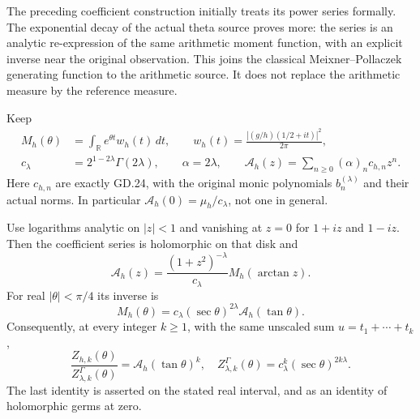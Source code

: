 The preceding coefficient construction initially treats its power series
formally. The exponential decay of the actual theta source proves more:
the series is an analytic re-expression of the same arithmetic moment
function, with an explicit inverse near the original observation.
This joins the classical Meixner--Pollaczek generating function to the
arithmetic source. It does not replace the arithmetic measure by the
reference measure.

Keep
\[
\begin{split}
M_h(\theta)&=\int_{\mathbb R}e^{\theta t}w_h(t)\,dt,
\qquad w_h(t)=\frac{|(g/h)(1/2+it)|^2}{2\pi},\\
c_\lambda&=2^{1-2\lambda}\Gamma(2\lambda),\qquad
\alpha=2\lambda,\qquad
\mathcal A_h(z)=\sum_{n\geq0}(\alpha)_n c_{h,n}z^n.
\end{split}
\]
Here \(c_{h,n}\) are exactly GD.24, with the original monic polynomials
\(b_n^{(\lambda)}\) and their actual norms. In particular
\(\mathcal A_h(0)=\mu_h/c_\lambda\), not one in general.

\begin{proposition}
Use logarithms analytic on \(|z|<1\) and vanishing at \(z=0\) for
\(1+iz\) and \(1-iz\). Then the coefficient series is holomorphic on
that disk and
\[
\boxed{\mathcal A_h(z)=
 \frac{(1+z^2)^{-\lambda}}{c_\lambda}
 M_h(\arctan z).} \tag{GJ.1}
\]
For real \(|\theta|<\pi/4\) its inverse is
\[
\boxed{M_h(\theta)=c_\lambda(\sec\theta)^{2\lambda}
                 \mathcal A_h(\tan\theta).} \tag{GJ.2}
\]
Consequently, at every integer \(k\geq1\), with the same unscaled sum
\(u=t_1+\cdots+t_k\),
\[
\boxed{\frac{Z_{h,k}(\theta)}{Z^\Gamma_{\lambda,k}(\theta)}
       =\mathcal A_h(\tan\theta)^k,\quad
 Z^\Gamma_{\lambda,k}(\theta)
       =c_\lambda^k(\sec\theta)^{2k\lambda}.} \tag{GJ.3}
\]
The last identity is asserted on the stated real interval, and as an
identity of holomorphic germs at zero.
\end{proposition}

